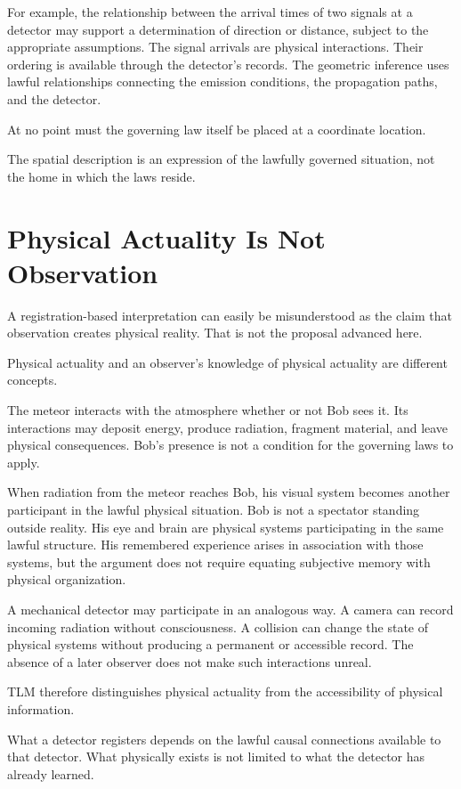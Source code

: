 \documentclass[12pt,onecolumn]{article}
\begin{document}
For example, the relationship between the arrival times of two signals at a detector may support a determination of direction or distance, subject to the appropriate assumptions. The signal arrivals are physical interactions. Their ordering is available through the detector's records. The geometric inference uses lawful relationships connecting the emission conditions, the propagation paths, and the detector.

At no point must the governing law itself be placed at a coordinate location.

The spatial description is an expression of the lawfully governed situation, not the home in which the laws reside.

\section{Physical Actuality Is Not Observation}

A registration-based interpretation can easily be misunderstood as the claim that observation creates physical reality. That is not the proposal advanced here.

Physical actuality and an observer's knowledge of physical actuality are different concepts.

The meteor interacts with the atmosphere whether or not Bob sees it. Its interactions may deposit energy, produce radiation, fragment material, and leave physical consequences. Bob's presence is not a condition for the governing laws to apply.

When radiation from the meteor reaches Bob, his visual system becomes another participant in the lawful physical situation. Bob is not a spectator standing outside reality. His eye and brain are physical systems participating in the same lawful structure. His remembered experience arises in association with those systems, but the argument does not require equating subjective memory with physical organization.

A mechanical detector may participate in an analogous way. A camera can record incoming radiation without consciousness. A collision can change the state of physical systems without producing a permanent or accessible record. The absence of a later observer does not make such interactions unreal.

TLM therefore distinguishes physical actuality from the accessibility of physical information.

What a detector registers depends on the lawful causal connections available to that detector. What physically exists is not limited to what the detector has already learned.
\end{document}

